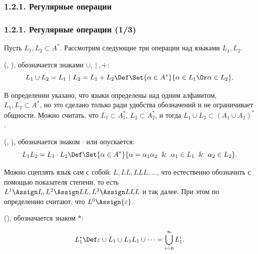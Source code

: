 \subsubsection{1.2.1. Регулярные операции}
\label{1.2.1.}
\begin{frame}
\frametitle{1.2.1. Регулярные операции (1/3)}

Пусть $L_1, L_2\subset A^*$. Рассмотрим следующие три операции над языками $L_1, L_2$.

(,
), обозначается знаками $\cup, ~|~, +$:
$$
L_1\cup L_2 = L_1 ~|~ L_2 = L_1 + L_2\Def \Set{\alpha \in A^*}{\alpha \in L_1 \Or \alpha\in L_2}.$$

\begin{remark}
В определении указано,
что языки определены 
над одним алфавитом, \\$L_1, L_2\subset A^*$,
но это сделано только ради удобства 
обозначений и не ограничивает общности.
Можно считать, что $L_1\subset A_1^*$, 
$L_2\subset A_2^*$, и тогда $L_1\cup L_2\subset (A_1\cup A_2)^*$.
\end{remark}

(,
), обозначается знаком $\cdot$ или
опускается:
$$
L_1 L_2= L_1\cdot L_2\Def \Set{\alpha\in A^*}
{\alpha=\alpha_1\alpha_2 \And \alpha_1\in L_1 \And \alpha_2\in
L_2}.
$$

\begin{remark}
Можно сцеплять язык сам с собой:
$L, LL, LLL, \dots$,
что естественно обозначить с
помощью показателя степени,
то есть $L^1\Assign L, L^2\Assign LL,
L^3\Assign LLL$ и так далее.
При этом по определению 
считают, что $L^0\Assign \{\varepsilon\}$.  
\end{remark}

 (), обозначается знаком $*$:

\vspace{-12pt}
$$
L_1^*\Def \varepsilon\cup L_1\cup L_1 L_1\cup\dots =
\bigcup_{i=0}^\infty L_1^i
.$$

\end{frame}

